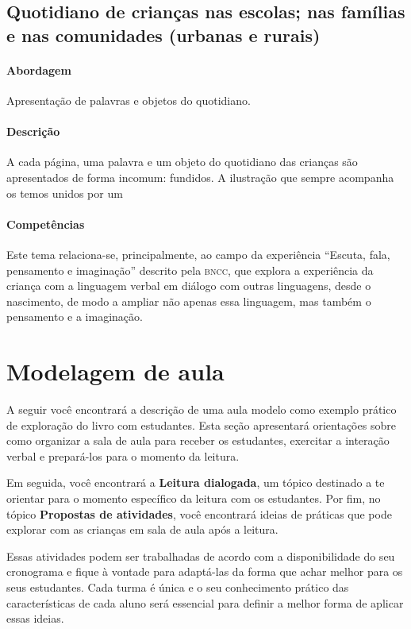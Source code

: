 \documentclass[11pt]{extarticle}
\begin{document}
\subsection{Quotidiano de crianças nas escolas; nas famílias e nas comunidades (urbanas e rurais)}

\paragraph{Abordagem} 
Apresentação de palavras e objetos do quotidiano.
\paragraph{Descrição} 
A cada página, uma palavra e um objeto do quotidiano das crianças são apresentados
de forma incomum: fundidos. A ilustração que sempre acompanha os temos unidos
por um 
\paragraph{Competências} Este tema relaciona-se, principalmente,
ao campo da experiência ``Escuta, fala, pensamento e imaginação''
descrito pela \textsc{bncc}, que explora a experiência da criança 
com a linguagem verbal em diálogo com outras linguagens, 
desde o nascimento, de modo a ampliar não apenas essa linguagem, 
mas também o pensamento e a imaginação.

\section{Modelagem de aula}
A seguir você encontrará a descrição de uma aula modelo como exemplo 
prático de exploração do livro com estudantes. Esta seção apresentará 
orientações sobre como organizar a sala de aula para receber os 
estudantes, exercitar a interação verbal e prepará-los para o 
momento da leitura.

Em seguida, você encontrará a \textbf{Leitura dialogada}, um 
tópico destinado a te orientar para o momento específico da 
leitura com os estudantes. Por fim, no tópico 
\textbf{Propostas de atividades}, você encontrará ideias 
de práticas que pode explorar com as crianças em sala de 
aula após a leitura. 

Essas atividades podem ser trabalhadas de acordo com a 
disponibilidade do seu cronograma e fique à vontade para adaptá-las 
da forma que achar melhor para os seus estudantes. Cada turma é única 
e o seu conhecimento prático das características de cada aluno será 
essencial para definir a melhor forma de aplicar essas ideias. 
\end{document}
